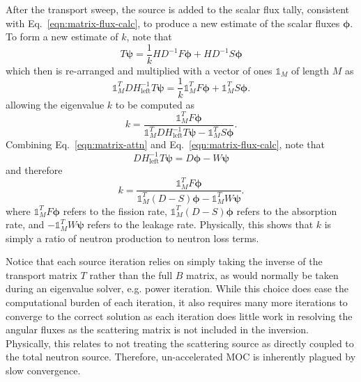 After the transport sweep, the source is added to the scalar flux tally, consistent with Eq.~\ref{eqn:matrix-flux-calc}, to produce a new estimate of the scalar fluxes $\boldsymbol{\phi}$. To form a new estimate of $k$, note that
\begin{equation}
T \boldsymbol{\psi} = \frac{1}{k} H D^{-1} F \boldsymbol{\phi} + H D^{-1} S \boldsymbol{\phi}
\end{equation}
which then is re-arranged and multiplied with a vector of ones $\mathbb{1}_M$ of length $M$ as
\begin{equation}
\mathbb{1}_M^T D H_{\text{left}}^{-1} T \boldsymbol{\psi}  = \frac{1}{k} \mathbb{1}_M^T  F \boldsymbol{\phi} + \mathbb{1}_M^T  S \boldsymbol{\phi}.
\end{equation}
allowing the eigenvalue $k$ to be computed as
\begin{equation}
k = \frac{\mathbb{1}_M^T F \boldsymbol{\phi}}{\mathbb{1}_M^T  D H_{\text{left}}^{-1} T \boldsymbol{\psi} - \mathbb{1}_M^T S \boldsymbol{\phi}}.
\end{equation}
Combining Eq.~\ref{eqn:matrix-attn} and Eq.~\ref{eqn:matrix-flux-calc}, note that
\begin{equation}
D H_{\text{left}}^{-1} T \boldsymbol{\psi} = D \boldsymbol{\phi} - W \boldsymbol{\psi}
\end{equation}
and therefore
\begin{equation}
k = \frac{\mathbb{1}_M^T F \boldsymbol{\phi}}{\mathbb{1}_M^T \left(D - S \right) \boldsymbol{\phi} - \mathbb{1}_M^T W \boldsymbol{\psi}}.
\end{equation}
where $\mathbb{1}_M^T F \boldsymbol{\phi}$ refers to the fission rate, $\mathbb{1}_M^T \left(D - S \right) \boldsymbol{\phi}$ refers to the absorption rate, and $-\mathbb{1}_M^T W \boldsymbol{\psi}$ refers to the leakage rate. Physically, this shows that $k$ is simply a ratio of neutron production to neutron loss terms.

Notice that each source iteration relies on simply taking the inverse of the transport matrix $T$ rather than the full $B$ matrix, as would normally be taken during an eigenvalue solver, e.g. power iteration. While this choice does ease the computational burden of each iteration, it also requires many more iterations to converge to the correct solution as each iteration does little work in resolving the angular fluxes as the scattering matrix is not included in the inversion. Physically, this relates to not treating the scattering source as directly coupled to the total neutron source. Therefore, un-accelerated MOC is inherently plagued by slow convergence. 

